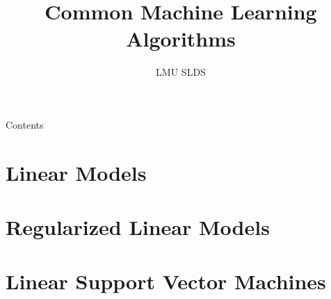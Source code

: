 




\title{Common Machine Learning Algorithms}
\author{LMU SLDS}
\date{}

\newcommand{\titlefigure}{figure_man/mckenzie_ai}
\newcommand{\titlefiguresize}{0.6}
\newcommand{\titlefiguresource}{https://www.vpnsrus.com/}







\lecturechapter{}

\begin{frame}{Contents}
  \tableofcontents
\end{frame}

\footnotesize

\section{Linear Models}


\section{Regularized Linear Models}


\section{Linear Support Vector Machines}



